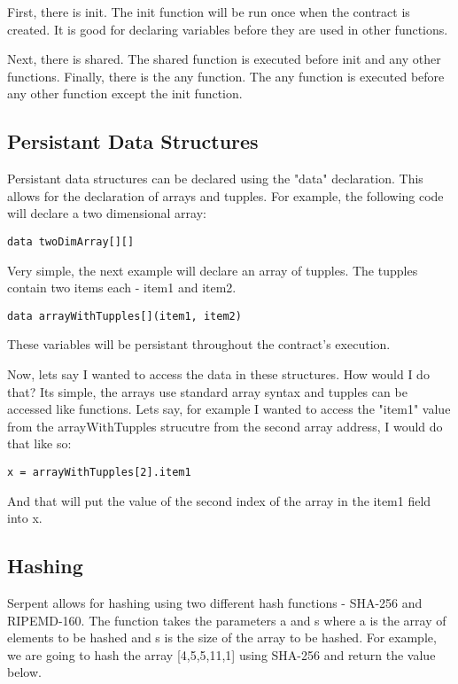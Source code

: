 \documentclass[12pt]{article}
\begin{document}
First, there is init. The init function will be run once when the contract is created. It is good for declaring variables before they are used in other functions.

Next, there is shared. The shared function is executed before init and any other functions. Finally, there is the any function. The any function is executed before any other function except the init function. \cite{Serpent}

\subsection{Persistant Data Structures}

Persistant data structures can be declared using the "data" declaration. This allows for the declaration of arrays and tupples. For example, the following code will declare a two dimensional array:

\begin{lstlisting}
data twoDimArray[][]
\end{lstlisting}

Very simple, the next example will declare an array of tupples. The tupples contain two items each - item1 and item2.

\begin{lstlisting}
data arrayWithTupples[](item1, item2)
\end{lstlisting}

These variables will be persistant throughout the contract's execution.

Now, lets say I wanted to access the data in these structures. How would I do that? Its simple, the arrays use standard array syntax and tupples can be accessed like functions. Lets say, for example I wanted to access the "item1" value from the arrayWithTupples strucutre from the second array address, I would do that like so:

\begin{lstlisting}
x = arrayWithTupples[2].item1
\end{lstlisting}

And that will put the value of the second index of the array in the item1 field into x. \cite{Serpent}

\subsection{Hashing}
Serpent allows for hashing using two different hash functions - SHA-256 and RIPEMD-160. The function takes the parameters a and s where a is the array of elements to be hashed and s is the size of the array to be hashed. For example, we are going to hash the array [4,5,5,11,1] using SHA-256 and return the value below. \cite{Serpent}
\end{document}

